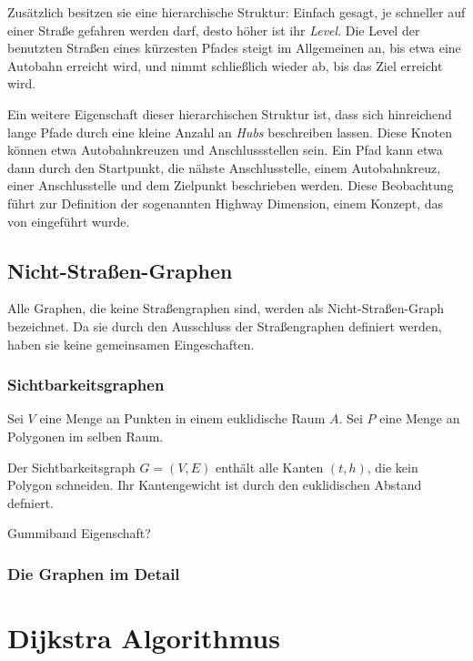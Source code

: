 Zusätzlich besitzen sie eine hierarchische Struktur: Einfach gesagt, je schneller auf einer Straße gefahren werden darf, desto höher ist ihr \emph{Level}.
Die Level der benutzten Straßen eines kürzesten Pfades steigt im Allgemeinen an, bis etwa eine Autobahn erreicht wird, und nimmt schließlich wieder ab, bis das Ziel erreicht wird.


Ein weitere Eigenschaft dieser hierarchischen Struktur ist, dass sich hinreichend lange Pfade durch eine kleine Anzahl an \emph{Hubs} beschreiben lassen.
Diese Knoten können etwa Autobahnkreuzen und Anschlussstellen sein.
Ein Pfad kann etwa dann durch den Startpunkt, die nähste Anschlusstelle, einem Autobahnkreuz, einer Anschlusstelle und dem Zielpunkt beschrieben werden.
Diese Beobachtung führt zur Definition der sogenannten Highway Dimension, einem Konzept, das von \cite{abraham2010highway} eingeführt wurde.

\subsection{Nicht-Straßen-Graphen}

Alle Graphen, die keine Straßengraphen sind, werden als Nicht-Straßen-Graph bezeichnet.
Da sie durch den Ausschluss der Straßengraphen definiert werden, haben sie keine gemeinsamen Eingeschaften.

\subsubsection{Sichtbarkeitsgraphen}

\begin{definition}[Sichtbarkeitsgraph]
    Sei $V$ eine Menge an Punkten in einem euklidische Raum $A$. Sei $P$ eine Menge an Polygonen im selben Raum.

    Der Sichtbarkeitsgraph $G = (V, E)$ enthält alle Kanten $(t, h)$, die kein Polygon schneiden.
    Ihr Kantengewicht ist durch den euklidischen Abstand defniert.
\end{definition}


Gummiband Eigenschaft?

\subsubsection{Die Graphen im Detail}


\section{Dijkstra Algorithmus}

